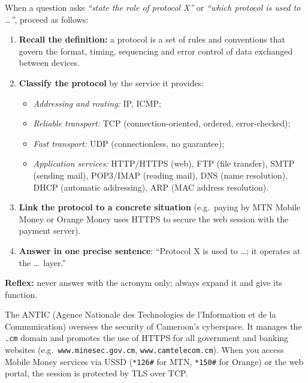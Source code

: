 \documentclass[11pt]{article}
\newcommand{\cle}[1]{{\popxbold\color{popdark}#1}}
\begin{document}
\begin{methode}
When a question asks \emph{``state the role of protocol X''} or \emph{``which protocol is used to \ldots''}, proceed as follows:
\begin{enumerate}
\item \textbf{Recall the definition:} a \cle{protocol} is a set of rules and conventions that govern the format, timing, sequencing and error control of data exchanged between devices.
\item \textbf{Classify the protocol} by the service it provides:
\begin{itemize}
\item \emph{Addressing and routing:} IP, ICMP;
\item \emph{Reliable transport:} TCP (connection-oriented, ordered, error-checked);
\item \emph{Fast transport:} UDP (connectionless, no guarantee);
\item \emph{Application services:} HTTP/HTTPS (web), FTP (file transfer), SMTP (sending mail), POP3/IMAP (reading mail), DNS (name resolution), DHCP (automatic addressing), ARP (MAC address resolution).
\end{itemize}
\item \textbf{Link the protocol to a concrete situation} (e.g.\ paying by MTN Mobile Money or Orange Money uses HTTPS to secure the web session with the payment server).
\item \textbf{Answer in one precise sentence}: ``Protocol X is used to \ldots; it operates at the \ldots\ layer.''
\end{enumerate}
\textbf{Reflex:} never answer with the acronym only; always expand it and give its function.
\end{methode}

\begin{savaistu}
The \cle{ANTIC} (Agence Nationale des Technologies de l'Information et de la Communication) oversees the security of Cameroon's cyberspace. It manages the \texttt{.cm} domain and promotes the use of HTTPS for all government and banking websites (e.g.\ \texttt{www.minesec.gov.cm}, \texttt{www.camtelecom.cm}). When you access Mobile Money services via USSD (\texttt{*126\#} for MTN, \texttt{*150\#} for Orange) or the web portal, the session is protected by TLS over TCP.
\end{savaistu}
\end{document}
